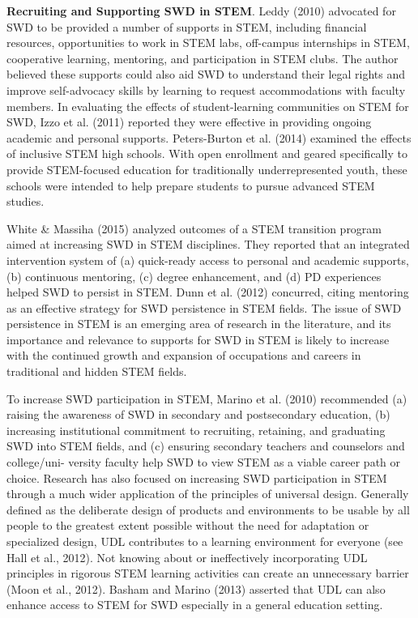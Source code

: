 \documentclass[11.5pt]{sig-alternate}
\begin{document}
\begin{large}
\textbf{Recruiting and Supporting SWD in STEM}. Leddy (2010) advocated for SWD to be provided a number of supports in STEM, including financial resources, opportunities to work in STEM labs, off-campus internships in STEM, cooperative learning, mentoring, and participation in STEM clubs. The author believed these supports could also aid SWD to understand their legal rights and improve self-advocacy skills by learning to request accommodations with faculty members. In evaluating the effects of student-learning communities on STEM for SWD, Izzo et al. (2011) reported they were effective in providing ongoing academic and personal supports. Peters-Burton et al. (2014) examined the effects of inclusive STEM high schools. With open enrollment and geared specifically to provide STEM-focused education for traditionally underrepresented youth, these schools were intended to help prepare students to pursue advanced STEM studies.

White \& Massiha (2015) analyzed outcomes of a STEM transition program aimed at increasing SWD in STEM disciplines. They reported that an integrated intervention system of (a) quick-ready access to personal and academic supports, (b) continuous mentoring, (c) degree enhancement, and (d) PD experiences helped SWD to persist in STEM. Dunn et al. (2012) concurred, citing mentoring as an effective strategy for SWD persistence in STEM fields. The issue of SWD persistence in STEM is an emerging area of research in the literature, and its importance and relevance to supports for SWD in STEM is likely to increase with the continued growth and expansion of occupations and careers in traditional and hidden STEM fields.  

 To increase SWD participation in STEM, Marino et al. (2010) recommended (a) raising the awareness of SWD in secondary and postsecondary education, (b) increasing institutional commitment to recruiting, retaining, and graduating SWD into STEM fields, and (c) ensuring secondary teachers and counselors and college/uni- versity faculty help SWD to view STEM as a viable career path or choice. Research has also focused on increasing SWD participation in STEM through a much wider application of the principles of universal design. Generally defined as the deliberate design of products and environments to be usable by all people to the greatest extent possible without the need for adaptation or specialized design, UDL contributes to a learning environment for everyone (see Hall et al., 2012). Not knowing about or ineffectively incorporating UDL principles in rigorous STEM learning activities can create an unnecessary barrier (Moon et al., 2012). Basham and Marino (2013) asserted that UDL can also enhance access to STEM for SWD especially in a general education setting.  
 

\end{large}
\end{document}
